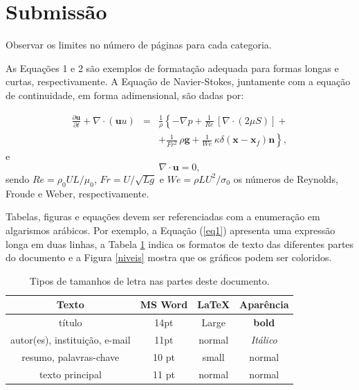 \documentclass[a4paper,11pt]{article}
\begin{document}
{\section*{Submissão}

Observar os limites no número de páginas para cada categoria.

As Equações 1 e 2 são exemplos de formatação adequada para formas longas e curtas, respectivamente. A Equação de Navier-Stokes, juntamente com a equação de continuidade, em forma adimensional, são dadas por:

\begin{eqnarray}
\nonumber
\frac{\partial {\mathbf u}}{\partial t} + \nabla \cdot ({\mathbf uu}) &=& \frac{1}{\rho}\left\{-\nabla p + \frac{1}{Re}\,[\nabla \cdot (2 \mu S)] +\right.
\\
&& \left.+\frac{1}{Fr^2}\,\rho {\mathbf g} +
\frac{1}{We}\,\kappa \delta ({\mathbf x} - {\mathbf x}_f) {\mathbf n}\right\},
\label{eq1}
\end{eqnarray}
e
\begin{equation}
\nabla \cdot {\mathbf u} = 0,
\label{eq2}
\end{equation}
\normalsize
sendo $Re = \rho_{0}UL/ \mu_{0}$, $Fr = U/ \sqrt{Lg}$ e $We = \rho L U^2 /\sigma_{0}$ os números de Reynolds, Froude e Weber, respectivamente.

Tabelas, figuras e equações devem ser referenciadas com a enumeração em algarismos arábicos. Por exemplo, a Equação (\ref{eq1}) apresenta uma expressão longa em duas linhas, a Tabela \ref{fonts} indica os formatos de texto das diferentes partes do documento e a Figura \ref{niveis} mostra que os gráficos podem ser coloridos.


\begin{table}[h]
\caption{{\small Tipos de tamanhos de letra nas partes deste documento.}}\label{fonts}
\centering
\begin{tabular}{|c|c|c|c|}
\hline
{\bf Texto} & {\bf MS Word} & {\bf LaTeX} & {\bf Aparência} \\
\hline
título & 14pt & Large & \textbf{bold}\\
autor(es), instituição, e-mail & 11pt & normal & \textit{Itálico}\\
resumo, palavras-chave  &	10 pt	 & small  &	{\small normal}\\
texto principal	 &11 pt & normal & normal\\
\hline
\end{tabular}
\end{table}

}
\end{document}
